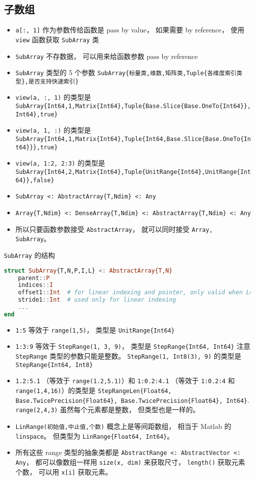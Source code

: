 \subsection{子数组}
\begin{itemize}
\item \verb|a[:, 1]| 作为参数传给函数是 pass by value， 如果需要 by reference， 使用 \verb|view| 函数获取 \verb|SubArray| 类
\item \verb|SubArray| 不存数据， 可以用来给函数参数 pass by reference
\item \verb|SubArray| 类型的 5 个参数 \verb|SubArray{标量类,维数,矩阵类,Tuple{各维度索引类型},是否支持快速索引}|
\item \verb|view(a, :, 1)| 的类型是 \verb|SubArray{Int64,1,Matrix{Int64},Tuple{Base.Slice{Base.OneTo{Int64}},Int64},true}|
\item \verb|view(a, 1, :)| 的类型是 \verb|SubArray{Int64,1,Matrix{Int64},Tuple{Int64,Base.Slice{Base.OneTo{Int64}}},true}|
\item \verb|view(a, 1:2, 2:3)| 的类型是 \verb|SubArray{Int64,2,Matrix{Int64},Tuple{UnitRange{Int64},UnitRange{Int64}},false}|
\item \verb|SubArray <: AbstractArray{T,Ndim} <: Any|
\item \verb|Array{T,Ndim} <: DenseArray{T,Ndim} <: AbstractArray{T,Ndim} <: Any|
\item 所以只要函数参数接受 \verb|AbstractArray|， 就可以同时接受 \verb|Array, SubArray|。
\end{itemize}

\verb|SubArray| 的结构
\begin{lstlisting}[language=julia]
struct SubArray{T,N,P,I,L} <: AbstractArray{T,N}
    parent::P
    indices::I
    offset1::Int  # for linear indexing and pointer, only valid when L==true
    stride1::Int  # used only for linear indexing
    ...
end
\end{lstlisting}

\begin{itemize}
\item \verb|1:5| 等效于 \verb|range(1,5)|， 类型是 \verb|UnitRange{Int64}|
\item \verb|1:3:9| 等效于 \verb|StepRange(1, 3, 9)|， 类型是 \verb|StepRange{Int64, Int64}| 注意 \verb|StepRange| 类型的参数只能是整数。 \verb|StepRange(1, Int8(3), 9)| 的类型是 \verb|StepRange{Int64, Int8}|
\item \verb|1.2:5.1| （等效于 \verb|range(1.2,5.1)|）和 \verb|1:0.2:4.1| （等效于 \verb|1:0.2:4| 和 \verb|range(1,4,16)|）的类型是 \verb|StepRangeLen{Float64, Base.TwicePrecision{Float64}, Base.TwicePrecision{Float64}, Int64}|. \verb|range(2,4,3)| 虽然每个元素都是整数， 但类型也是一样的。
\item \verb|LinRange(初始值,中止值,个数)| 概念上是等间距数组， 相当于 Matlab 的 \verb|linspace|。 但类型为 \verb|LinRange{Float64, Int64}|。
\item 所有这些 range 类型的抽象类都是 \verb|AbstractRange <: AbstractVector <: Any|， 都可以像数组一样用 \verb|size(x, dim)| 来获取尺寸， \verb|length()| 获取元素个数， 可以用 \verb|x[i]| 获取元素。
\end{itemize}


